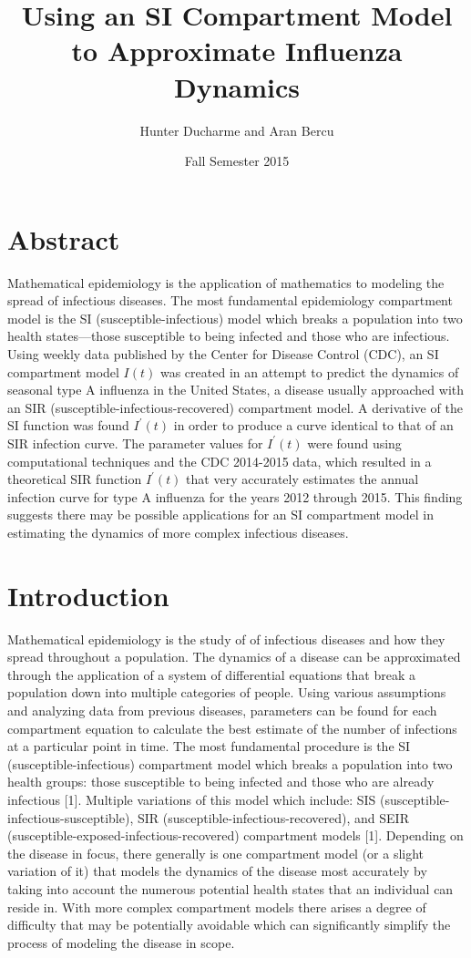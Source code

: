 \documentclass[11pt, oneside]{article}   	%
\title{Using an SI Compartment Model to Approximate Influenza Dynamics}
\author{Hunter Ducharme and Aran Bercu}
\affil{Honors Department, Lone Star College}
\date{Fall Semester 2015}
\begin{document}
\maketitle


\section{Abstract} 
\noindent Mathematical epidemiology is the application of mathematics to modeling the spread of infectious diseases. The most fundamental epidemiology compartment model is the SI (susceptible-infectious) model which breaks a population into two health states---those susceptible to being infected and those who are infectious. Using weekly data published by the Center for Disease Control (CDC), an SI compartment model $I(t)$ was created in an attempt to predict the dynamics of seasonal type A influenza in the United States, a disease usually approached with an SIR (susceptible-infectious-recovered) compartment model. A derivative of the SI function was found $I^\prime(t)$ in order to produce a curve identical to that of an SIR infection curve. The parameter values for $I^\prime(t)$ were found using computational techniques and the CDC 2014-2015 data, which resulted in a theoretical SIR function $I^\prime(t)$ that very accurately estimates the annual infection curve for type A influenza for the years 2012 through 2015. This finding suggests there may be possible applications for an SI compartment model in estimating the dynamics of more complex infectious diseases.

\section{Introduction}
Mathematical epidemiology is the study of of infectious diseases and how they spread throughout a population. The dynamics of a disease can be approximated through the application of a system of differential equations that break a population down into multiple categories of people. Using various assumptions and analyzing data from previous diseases, parameters can be found for each compartment equation to calculate the best estimate of the number of infections at a particular point in time. The most fundamental procedure is the SI (susceptible-infectious) compartment model which breaks a population into two health groups: those susceptible to being infected and those who are already infectious [1]. Multiple variations of this model which include: SIS (susceptible-infectious-susceptible), SIR (susceptible-infectious-recovered), and SEIR (susceptible-exposed-infectious-recovered) compartment models [1]. Depending on the disease in focus, there generally is one compartment model (or a slight variation of it) that models the dynamics of the disease most accurately by taking into account the numerous potential health states that an individual can reside in. With more complex compartment models there arises a degree of difficulty that may be potentially avoidable which can significantly simplify the process of modeling the disease in scope.
\end{document}
